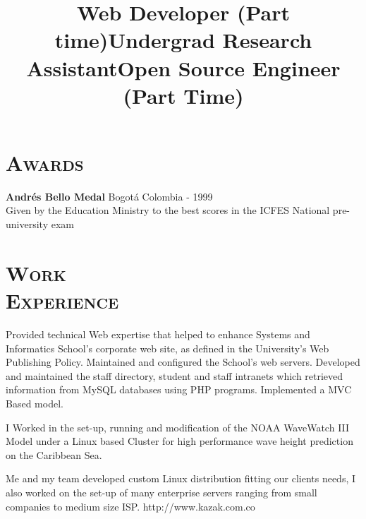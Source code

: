 \begin{resume}
\section{\textsc{Awards}}
\textbf{Andr\'{e}s Bello Medal} \hfill  Bogot\'{a} Colombia - 1999 \\
Given by the Education Ministry to the best scores in the ICFES National pre-university exam \hfill \\
\newline



\section{\textsc{Work\\ Experience}}

\title{\textbf{Web Developer} (Part time)}
\begin{position}
Provided technical Web expertise that helped to enhance Systems and Informatics School's corporate web site, 
as defined in the University's Web Publishing Policy. Maintained and configured the School's web servers. Developed and maintained the staff directory, student and staff intranets which retrieved information from MySQL databases using PHP programs. Implemented a MVC Based model.
\end{position}

\title{\textbf{Undergrad Research Assistant}}
\begin{position}
I Worked in the set-up, running and modification of the NOAA WaveWatch III Model under a Linux based Cluster
for high performance wave height prediction on the Caribbean Sea.
\end{position}


\title{\textbf{Open Source Engineer} (Part Time)}
\begin{position}
Me and my team  developed custom  Linux distribution fitting
our clients needs, I also worked on  the set-up of many enterprise
servers ranging from small companies to medium size ISP. http://www.kazak.com.co
\end{position}



\end{resume}
